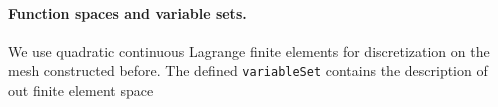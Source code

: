 \documentclass[11pt]{article}
\newcommand{\K}{\textsc{Kaskade7 }}
\begin{document}
%
%
%






\paragraph{Function spaces and variable sets.}

We use quadratic continuous Lagrange finite elements for discretization on the mesh constructed before.
The defined {\tt variableSet} contains the description of out finite element space\\
\end{document}
